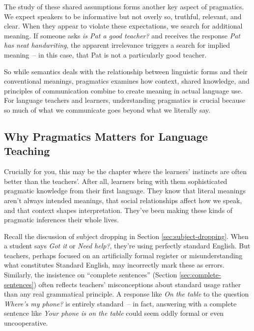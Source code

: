 The study of these shared assumptions forms another key aspect of pragmatics. We expect speakers to be informative but not overly so, truthful, relevant, and clear. When they appear to violate these expectations, we search for additional meaning. If someone asks \textit{is Pat a good teacher?} and receives the response \textit{Pat has neat handwriting}, the apparent irrelevance triggers a search for implied meaning~-- in this case, that Pat is not a particularly good teacher.

So while semantics deals with the relationship between linguistic forms and their conventional meanings, pragmatics examines how context, shared knowledge, and principles of communication combine to create meaning in actual language use. For language teachers and learners, understanding pragmatics is crucial because so much of what we communicate goes beyond what we literally say.

\subsection{Why Pragmatics Matters for Language Teaching}

Crucially for you, this may be the chapter where the learners' instincts are often better than the teachers'. After all, learners bring with them sophisticated pragmatic knowledge from their first language. They know that literal meanings aren't always intended meanings, that social relationships affect how we speak, and that context shapes interpretation. They've been making these kinds of pragmatic inferences their whole lives.

Recall the discussion of subject dropping in Section \ref{sec:subject-dropping}. When a student says \textit{Got it} or \textit{Need help?}, they're using perfectly standard English. But teachers, perhaps focused on an artificially formal register or misunderstanding what constitutes Standard English, may incorrectly mark these as errors. Similarly, the insistence on ``complete sentences'' (Section \ref{sec:complete-sentences}) often reflects teachers' misconceptions about standard usage rather than any real grammatical principle. A response like \textit{On the table} to the question \textit{Where's my phone?} is entirely standard~-- in fact, answering with a complete sentence like \textit{Your phone is on the table} could seem oddly formal or even uncooperative.

